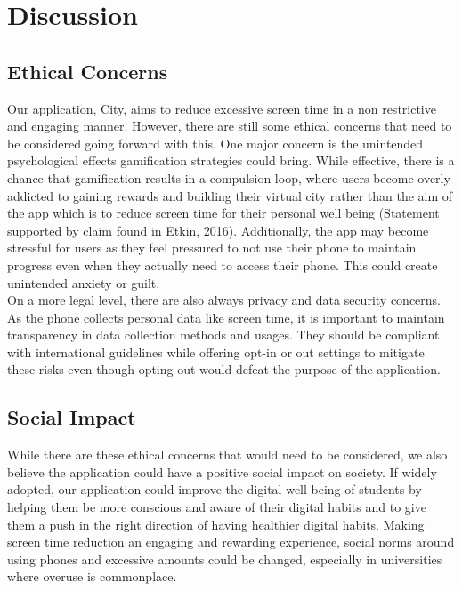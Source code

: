 \documentclass[sigconf, 11pt]{acmart}
\begin{document}
\section{Discussion}
\subsection{Ethical Concerns}
Our application, City, aims to reduce excessive screen time in a non restrictive and engaging manner. However, there are still some ethical concerns that need to be considered going forward with this. One major concern is the unintended psychological effects gamification strategies could bring. While effective, there is a chance that gamification results in a compulsion loop, where users become overly addicted to gaining rewards and building their virtual city rather than the aim of the app which is to reduce screen time for their personal well being (Statement supported by claim found in Etkin, 2016). Additionally, the app may become stressful for users as they feel pressured to not use their phone to maintain progress even when they actually need to access their phone. This could create unintended anxiety or guilt.
\\
On a more legal level, there are also always privacy and data security concerns. As the phone collects personal data like screen time, it is important to maintain transparency in data collection methods and usages. They should be compliant with international guidelines while offering opt-in or out settings to mitigate these risks even though opting-out would defeat the purpose of the application.
\\

\subsection{Social Impact}
While there are these ethical concerns that would need to be considered, we also believe the application could have a positive social impact on society. If widely adopted, our application could improve the digital well-being of students by helping them be more conscious and aware of their digital habits and to give them a push in the right direction of having healthier digital habits. Making screen time reduction an engaging and rewarding experience, social norms around using phones and excessive amounts could be changed, especially in universities where overuse is commonplace.
\\
\end{document}

